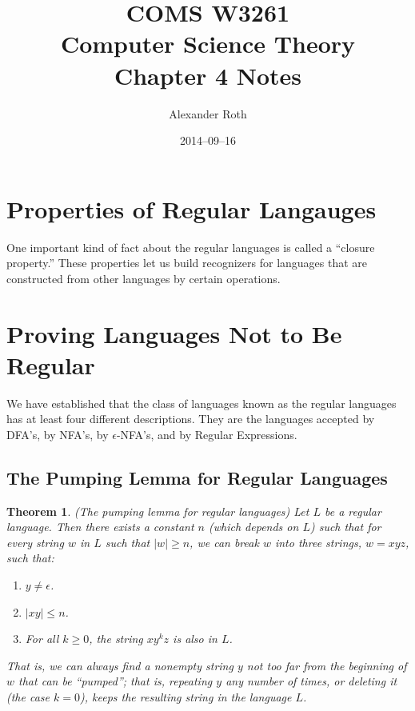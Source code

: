 \documentclass[]{article}
\begin{document}
\title{COMS W3261 \\ Computer Science Theory \\ Chapter 4 Notes}
\author{Alexander Roth}
\date{2014--09--16}
\maketitle
\newtheorem{thm}{Theorem}

\section*{Properties of Regular Langauges}
  One important kind of fact about the regular languages is called a ``closure
  property.'' These properties let us build recognizers for languages that are
  constructed from other languages by certain operations.

\section*{Proving Languages Not to Be Regular}
  We have established that the class of languages known as the regular languages
  has at least four different descriptions. They are the languages accepted by
  DFA's, by NFA's, by $\epsilon$-NFA's, and by Regular Expressions.

  \subsection*{The Pumping Lemma for Regular Languages}
    \begin{thm}
      (The pumping lemma for regular languages) Let $L$ be a regular language.
      Then there exists a constant $n$ (which depends on $L$) such that for
      every string $w$ in $L$ such that $|w| \geq n$, we can break $w$ into
      three strings, $w = xyz$, such that:
        \begin{enumerate}
          \item $y \neq \epsilon$.
          \item $|xy| \leq n$.
          \item For all $k \geq 0$, the string $xy^kz$ is also in $L$.
        \end{enumerate}
      That is, we can always find a nonempty string $y$ not too far from the
      beginning of $w$ that can be ``pumped''; that is, repeating $y$ any number
      of times, or deleting it (the case $k = 0$), keeps the resulting string in
      the language $L$.
    \end{thm}
\end{document}
